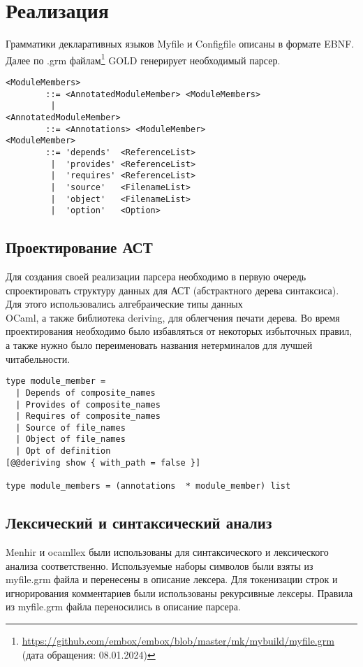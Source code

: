 
\section{Реализация}
Грамматики декларативных языков Myfile и Configfile описаны в формате EBNF. Далее по .grm файлам\footnote{\href{https://github.com/embox/embox/blob/master/mk/mybuild/myfile.grm}{https://github.com/embox/embox/blob/master/mk/mybuild/myfile.grm} (дата обращения: 08.01.2024)} GOLD генерирует необходимый парсер.
\begin{lstlisting}[caption=Пример описания грамматики, frame=single, breaklines]
<ModuleMembers>
        ::= <AnnotatedModuleMember> <ModuleMembers>
         |
<AnnotatedModuleMember>
        ::= <Annotations> <ModuleMember>
<ModuleMember>
        ::= 'depends'  <ReferenceList>
         |  'provides' <ReferenceList>
         |  'requires' <ReferenceList>
         |  'source'   <FilenameList>
         |  'object'   <FilenameList>
         |  'option'   <Option>
\end{lstlisting}
\subsection{Проектирование АСТ}
Для создания своей реализации парсера необходимо в первую очередь спроектировать структуру данных для АСТ (абстрактного дерева синтаксиса). Для этого использовались алгебраические типы данных \\ OCaml, а также библиотека deriving, для облегчения печати дерева. Во время проектирования необходимо было избавляться от некоторых избыточных правил, а также нужно было переименовать названия нетерминалов для лучшей читабельности.
\begin{lstlisting}[caption=Пример структуры данных из \href{https://github.com/mikhaylovilya/caravan/blob/master/src/parser/ast.mli\#L43C1-L53C40}{ast.mli} , language=caml, frame=single, breaklines]
type module_member =
  | Depends of composite_names
  | Provides of composite_names
  | Requires of composite_names
  | Source of file_names
  | Object of file_names
  | Opt of definition
[@@deriving show { with_path = false }]

type module_members = (annotations  * module_member) list
\end{lstlisting}
\subsection{Лексический и синтаксический анализ}
Menhir и ocamllex были использованы для синтаксического и лексического анализа соответственно. Используемые наборы символов были взяты из myfile.grm файла и перенесены в описание лексера. Для токенизации строк и игнорирования комментариев были использованы рекурсивные лексеры. Правила из myfile.grm файла переносились в описание парсера.

